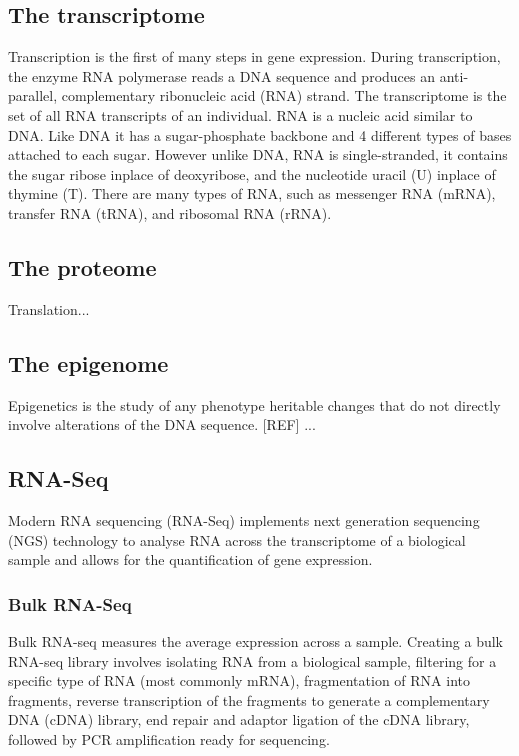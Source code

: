 
\subsection{The transcriptome}
Transcription is the first of many steps in gene expression.
During transcription, the enzyme RNA polymerase reads a DNA sequence and produces an anti-parallel, complementary ribonucleic acid (RNA) strand.
The transcriptome is the set of all RNA transcripts of an individual.
RNA is a nucleic acid similar to DNA\@.
Like DNA it has a sugar-phosphate backbone and 4 different types of bases attached to each sugar.
However unlike DNA, RNA is single-stranded, it contains the sugar ribose inplace of deoxyribose, and the nucleotide uracil (U) inplace of thymine (T).
There are many types of RNA, such as messenger RNA (mRNA), transfer RNA (tRNA), and ribosomal RNA (rRNA).

\subsection{The proteome}
Translation...

\subsection{The epigenome}
Epigenetics is the study of any phenotype heritable changes that do not directly involve alterations of the DNA sequence. [REF]
...


\subsection{RNA-Seq}
Modern RNA sequencing (RNA-Seq) implements next generation sequencing (NGS) technology to analyse RNA across the transcriptome of a biological sample and allows for the quantification of gene expression.

\subsubsection{Bulk RNA-Seq}
Bulk RNA-seq measures the average expression across a sample.
Creating a bulk RNA-seq library involves isolating RNA from a biological sample, filtering for a specific type of RNA (most commonly mRNA), fragmentation of RNA into fragments, reverse transcription of the fragments to generate a complementary DNA (cDNA) library, end repair and adaptor ligation of the cDNA library, followed by PCR amplification ready for sequencing.

